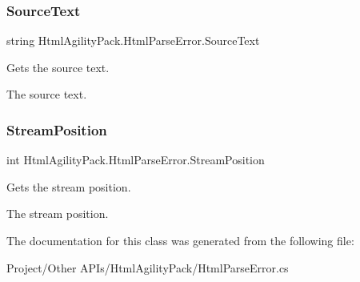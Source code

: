 \subsubsection{\texorpdfstring{Source\+Text}{SourceText}}
{\footnotesize\ttfamily string Html\+Agility\+Pack.\+Html\+Parse\+Error.\+Source\+Text\hspace{0.3cm}{\ttfamily [get]}}



Gets the source text. 

The source text.\mbox{\label{class_html_agility_pack_1_1_html_parse_error_ad225cae4703ea017eb132a0d2c7061e8}} 
\subsubsection{\texorpdfstring{Stream\+Position}{StreamPosition}}
{\footnotesize\ttfamily int Html\+Agility\+Pack.\+Html\+Parse\+Error.\+Stream\+Position\hspace{0.3cm}{\ttfamily [get]}}



Gets the stream position. 

The stream position.

The documentation for this class was generated from the following file\+:\begin{DoxyCompactItemize}
\item 
Project/\+Other A\+P\+Is/\+Html\+Agility\+Pack/Html\+Parse\+Error.\+cs\end{DoxyCompactItemize}
